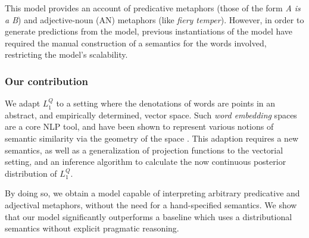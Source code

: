 \documentclass[OpenMind]{stjour}
\newcommand{\Listener}{L}
\newcommand{\QLONE}{\Listener_{{1}}^{{Q}}}
\begin{document}
	This model provides an account of predicative metaphors (those of the form \emph{A is a B}) and adjective-noun (AN) metaphors (like \emph{fiery temper}). However, in order to generate predictions from the model, previous instantiations of the model have required the manual construction of a semantics for the words involved, restricting the model's scalability.


	




	\subsubsection{Our contribution} We adapt $\QLONE$ to a setting where the denotations of words are points in an abstract, and empirically determined, vector space. Such \emph{word embedding} spaces are a core NLP tool, and have been shown to represent various notions of semantic similarity via the geometry of the space \citep{pennington2014glove}.
	This adaption requires a new semantics, as well as a generalization of projection functions to the vectorial setting, and an inference algorithm to calculate the now continuous posterior distribution of $\QLONE$.
		


	By doing so, we obtain a model capable of interpreting arbitrary predicative and adjectival metaphors, without the need for a hand-specified semantics. We show that our model significantly outperforms a baseline which uses a distributional semantics without explicit pragmatic reasoning.
\end{document}
